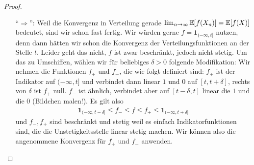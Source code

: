 \begin{proof}\abs
	\begin{itemize}
		\item[\enquote{$\Rightarrow$}:] Weil die Konvergenz in Verteilung gerade $\lim_{n\to\infty} \mathbb{E}[f(X_n)] = \mathbb{E}[f(X)]$ bedeutet, sind wir schon fast fertig. Wir w\"urden gerne $f=\mathbf{1}_{(-\infty,t]}$ nutzen, denn dann h\"atten wir schon die Konvergenz der Verteilungsfunktionen an der Stelle $t$. Leider geht das nicht, $f$ ist zwar beschr\"ankt, jedoch nicht stetig. Um das zu Umschiffen, w\"ahlen wir f\"ur beliebiges $\delta>0$ folgende Modifikation: Wir nehmen die Funktionen $f_+$ und $f_-$, die wie folgt definiert sind: $f_+$ ist der Indikator auf $(-\infty,t]$ und verbindet dann linear $1$ und $0$ auf $[t,t+\delta]$, rechts von $\delta$ ist $f_+$ null. $f_-$ ist \"ahnlich, verbindet aber auf $[t-\delta,t]$ linear die $1$ und die $0$ (Bildchen malen!). Es gilt also 
	\begin{align*}	
		\mathbf{1}_{(-\infty,t-\delta]}\leq f_-\leq f\leq f_+\leq \mathbf{1}_{(-\infty,t+\delta]}
	\end{align*}	
		 und $f_-,f_+$ sind beschr\"ankt und stetig weil es einfach Indikatorfunktionen sind, die die Unstetigkeitsstelle linear stetig machen. Wir k\"onnen also die angenommene Konvergenz f\"ur $f_+$ und $f_-$ anwenden.\smallskip
		

\end{itemize}
\end{proof}
